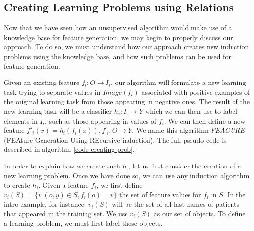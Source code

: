 \documentclass[twoside,11pt]{article}
\theoremstyle{definition}
\begin{document}
\subsection{Creating Learning Problems using Relations} \label{algorithm_section} 


Now that we have seen how an unsupervised algorithm would make use of a knowledge base for feature generation, we may begin to properly discuss our approach. To do so, we must understand how our approach creates new induction problems using the knowledge base, and how such problems can be used for feature generation.

Given an existing feature $f_{i}:O\rightarrow I_i$, our algorithm will formulate a new learning task trying to separate values in $Image(f_i)$ associated with positive examples of the original learning task from those appearing in negative ones. The result of the new learning task will be a classifier
$h_{i}:I_{i}\rightarrow Y$ which we can then use to label elements in $I_i$, such as those appearing in values of $f_{i}$. We can then define a new feature $f'_{i}(x)=h_{i}(f_{i}(x)), f'_{i}:O\rightarrow Y$.
We name this algorithm \emph{FEAGURE} (FEAture Generation Using REcursive induction). The full pseudo-code is described in algorithm \ref{code-creating-prob}.

In order to explain how we create such $h_{i}$, let us first consider the creation of a new learning problem. Once we have done so, we can use any induction algorithm to create $h_i$. 
Given a feature $f_{i}$, we first define $v_i(S) = \{v | (o,y) \in S, f_{i}(o)=v\}$ the set of feature values for $f_i$ in $S$. In the intro example, for instance, $v_i(S)$ will be the set of all last names of patients that appeared in the training set.
We use $v_i(S)$ as our set of objects. To define a learning problem, we must first label these objects.
\end{document}
